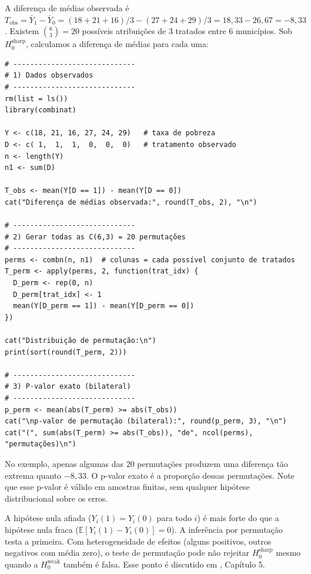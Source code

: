 A diferença de médias observada é $T_{\text{obs}} = \bar{Y}_1 - \bar{Y}_0 = (18+21+16)/3 - (27+24+29)/3 = 18{,}33 - 26{,}67 = -8{,}33$. Existem $\binom{6}{3} = 20$ possíveis atribuições de 3 tratados entre 6 municípios. Sob $H_0^{\text{sharp}}$, calculamos a diferença de médias para cada uma:

\begin{lstlisting}[style=Rstyle, caption={Inferência por permutação: exemplo com 6 municípios}]
# -----------------------------
# 1) Dados observados
# -----------------------------
rm(list = ls())
library(combinat)

Y <- c(18, 21, 16, 27, 24, 29)   # taxa de pobreza
D <- c( 1,  1,  1,  0,  0,  0)   # tratamento observado
n <- length(Y)
n1 <- sum(D)

T_obs <- mean(Y[D == 1]) - mean(Y[D == 0])
cat("Diferença de médias observada:", round(T_obs, 2), "\n")

# -----------------------------
# 2) Gerar todas as C(6,3) = 20 permutações
# -----------------------------
perms <- combn(n, n1)  # colunas = cada possível conjunto de tratados
T_perm <- apply(perms, 2, function(trat_idx) {
  D_perm <- rep(0, n)
  D_perm[trat_idx] <- 1
  mean(Y[D_perm == 1]) - mean(Y[D_perm == 0])
})

cat("Distribuição de permutação:\n")
print(sort(round(T_perm, 2)))

# -----------------------------
# 3) P-valor exato (bilateral)
# -----------------------------
p_perm <- mean(abs(T_perm) >= abs(T_obs))
cat("\np-valor de permutação (bilateral):", round(p_perm, 3), "\n")
cat("(", sum(abs(T_perm) >= abs(T_obs)), "de", ncol(perms), "permutações)\n")
\end{lstlisting}

No exemplo, apenas algumas das 20 permutações produzem uma diferença tão extrema quanto $-8{,}33$. O p-valor exato é a proporção dessas permutações. Note que esse p-valor é válido em amostras finitas, sem qualquer hipótese distribucional sobre os erros.

\begin{notabox}
A hipótese nula afiada ($Y_i(1) = Y_i(0)$ para todo $i$) é mais forte do que a hipótese nula fraca ($\mathbb{E}[Y_i(1) - Y_i(0)] = 0$). A inferência por permutação testa a primeira. Com heterogeneidade de efeitos (alguns positivos, outros negativos com média zero), o teste de permutação pode não rejeitar $H_0^{\text{sharp}}$ mesmo quando a $H_0^{\text{weak}}$ também é falsa. Esse ponto é discutido em \citet{Imbens2015}, Capítulo 5.
\end{notabox}


